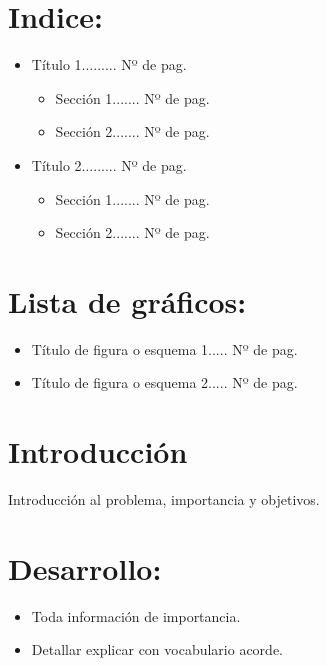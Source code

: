 \documentclass[12pt]{article}
\begin{document}
{{\begin{minipage}[c][\paperheight]{\paperwidth}
\section*{Indice:}

\begin{itemize}
    \item Título 1......... Nº de pag.
        \begin{itemize}
            \item Sección 1....... Nº de pag.
            \item Sección 2....... Nº de pag.
        \end{itemize}
    \item Título 2......... Nº de pag.
    \begin{itemize}
        \item Sección 1....... Nº de pag.
        \item Sección 2....... Nº de pag.
    \end{itemize}
\end{itemize}

\section*{Lista de gráficos:}

\begin{itemize}

    \item Título de figura o esquema 1..... Nº de pag.

    \item Título de figura o esquema 2..... Nº de pag.

\end{itemize}

\section*{Introducción}

Introducción al problema, importancia y objetivos.

\section*{Desarrollo:}
\begin{itemize}

    \item Toda información de importancia.

    \item Detallar explicar con vocabulario acorde. 


\end{itemize}
\end{minipage}}}
\end{document}
